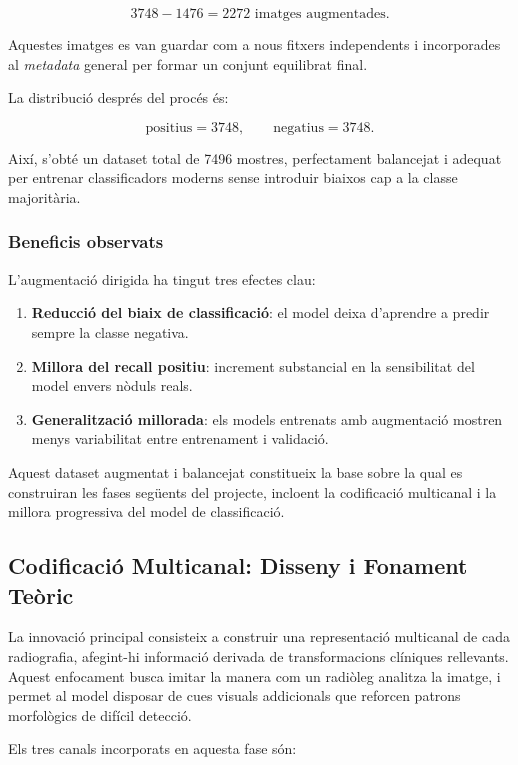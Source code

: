 \documentclass[12pt,a4paper]{article}
\begin{document}
\[
3748 - 1476 = 2272 \text{ imatges augmentades}.
\]

Aquestes imatges es van guardar com a nous fitxers independents i incorporades al
\textit{metadata} general per formar un conjunt equilibrat final.

La distribució després del procés és:

\[
\text{positius} = 3748, \qquad \text{negatius} = 3748.
\]

Així, s’obté un dataset total de 7496 mostres, perfectament balancejat i adequat per
entrenar classificadors moderns sense introduir biaixos cap a la classe majoritària.

\subsubsection*{Beneficis observats}

L’augmentació dirigida ha tingut tres efectes clau:

\begin{enumerate}
    \item \textbf{Reducció del biaix de classificació}: el model deixa d'aprendre a predir
    sempre la classe negativa.
    \item \textbf{Millora del recall positiu}: increment substancial en la sensibilitat del
    model envers nòduls reals.
    \item \textbf{Generalització millorada}: els models entrenats amb augmentació mostren
    menys variabilitat entre entrenament i validació.
\end{enumerate}

Aquest dataset augmentat i balancejat constitueix la base sobre la qual es construiran les
fases següents del projecte, incloent la codificació multicanal i la millora progressiva
del model de classificació.


\subsection{Codificació Multicanal: Disseny i Fonament Teòric}

La innovació principal consisteix a construir una representació multicanal de cada
radiografia, afegint-hi informació derivada de transformacions clíniques rellevants.
Aquest enfocament busca imitar la manera com un radiòleg analitza la imatge, i permet al
model disposar de cues visuals addicionals que reforcen patrons morfològics de difícil
detecció.

Els tres canals incorporats en aquesta fase són:
\end{document}
